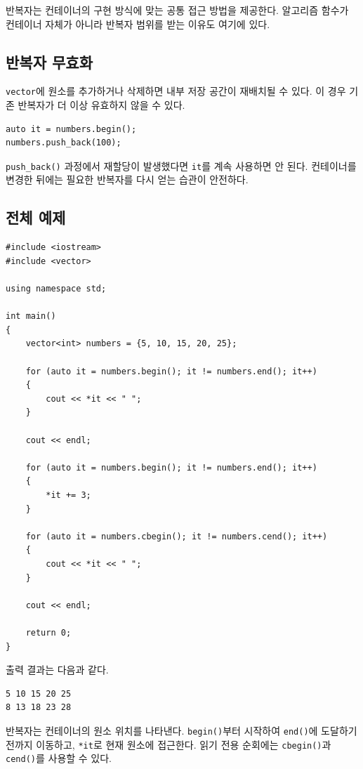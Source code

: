 \documentclass[11pt,a4paper]{article}
\begin{document}
반복자는 컨테이너의 구현 방식에 맞는 공통 접근 방법을 제공한다. 알고리즘 함수가 컨테이너 자체가 아니라 반복자 범위를 받는 이유도 여기에 있다.

\subsection{반복자 무효화}
\texttt{vector}에 원소를 추가하거나 삭제하면 내부 저장 공간이 재배치될 수 있다. 이 경우 기존 반복자가 더 이상 유효하지 않을 수 있다.

\begin{lstlisting}
auto it = numbers.begin();
numbers.push_back(100);
\end{lstlisting}

\texttt{push\_back()} 과정에서 재할당이 발생했다면 \texttt{it}를 계속 사용하면 안 된다. 컨테이너를 변경한 뒤에는 필요한 반복자를 다시 얻는 습관이 안전하다.

\subsection{전체 예제}
\begin{lstlisting}
#include <iostream>
#include <vector>

using namespace std;

int main()
{
    vector<int> numbers = {5, 10, 15, 20, 25};

    for (auto it = numbers.begin(); it != numbers.end(); it++)
    {
        cout << *it << " ";
    }

    cout << endl;

    for (auto it = numbers.begin(); it != numbers.end(); it++)
    {
        *it += 3;
    }

    for (auto it = numbers.cbegin(); it != numbers.cend(); it++)
    {
        cout << *it << " ";
    }

    cout << endl;

    return 0;
}
\end{lstlisting}

출력 결과는 다음과 같다.

\begin{verbatim}
5 10 15 20 25
8 13 18 23 28
\end{verbatim}

\begin{importantbox}
반복자는 컨테이너의 원소 위치를 나타낸다. \texttt{begin()}부터 시작하여 \texttt{end()}에 도달하기 전까지 이동하고, \texttt{*it}로 현재 원소에 접근한다. 읽기 전용 순회에는 \texttt{cbegin()}과 \texttt{cend()}를 사용할 수 있다.
\end{importantbox}
\end{document}
